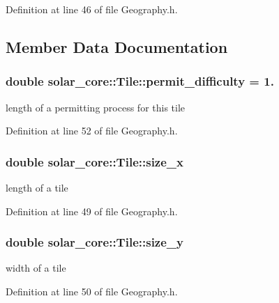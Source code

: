 Definition at line 46 of file Geography.\+h.



\subsection{Member Data Documentation}
\hypertarget{classsolar__core_1_1_tile_ac4cdbb55f06b95bd8c4a11a25d0b6635}{}
\subsubsection[{permit\+\_\+difficulty}]{\setlength{\rightskip}{0pt plus 5cm}double solar\+\_\+core\+::\+Tile\+::permit\+\_\+difficulty = 1.}\label{classsolar__core_1_1_tile_ac4cdbb55f06b95bd8c4a11a25d0b6635}
length of a permitting process for this tile 

Definition at line 52 of file Geography.\+h.

\hypertarget{classsolar__core_1_1_tile_ae8615b87d6d0c614de01b497fa63c27b}{}
\subsubsection[{size\+\_\+x}]{\setlength{\rightskip}{0pt plus 5cm}double solar\+\_\+core\+::\+Tile\+::size\+\_\+x}\label{classsolar__core_1_1_tile_ae8615b87d6d0c614de01b497fa63c27b}
length of a tile 

Definition at line 49 of file Geography.\+h.

\hypertarget{classsolar__core_1_1_tile_a698ac57539f58ed4e0a54b3135be6fb9}{}
\subsubsection[{size\+\_\+y}]{\setlength{\rightskip}{0pt plus 5cm}double solar\+\_\+core\+::\+Tile\+::size\+\_\+y}\label{classsolar__core_1_1_tile_a698ac57539f58ed4e0a54b3135be6fb9}
width of a tile 

Definition at line 50 of file Geography.\+h.

